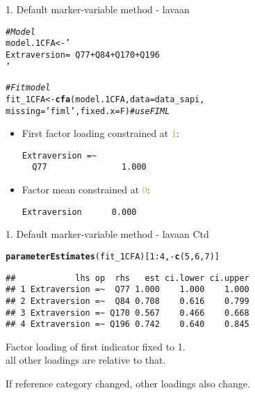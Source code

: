 \documentclass[10pt]{beamer}\usepackage[]{graphicx}\usepackage[]{xcolor}
\makeatletter
\newcommand{\hlnum}[1]{\textcolor[rgb]{0.686,0.059,0.569}{#1}}%
\newcommand{\hlsng}[1]{\textcolor[rgb]{0.192,0.494,0.8}{#1}}%
\newcommand{\hlcom}[1]{\textcolor[rgb]{0.678,0.584,0.686}{\textit{#1}}}%
\newcommand{\hlopt}[1]{\textcolor[rgb]{0,0,0}{#1}}%
\newcommand{\hldef}[1]{\textcolor[rgb]{0.345,0.345,0.345}{#1}}%
\newcommand{\hlkwb}[1]{\textcolor[rgb]{0.69,0.353,0.396}{#1}}%
\newcommand{\hlkwc}[1]{\textcolor[rgb]{0.333,0.667,0.333}{#1}}%
\newcommand{\hlkwd}[1]{\textcolor[rgb]{0.737,0.353,0.396}{\textbf{#1}}}%
\newenvironment{kframe}{%
 \def\at@end@of@kframe{}%
 \ifinner\ifhmode%
  \def\at@end@of@kframe{\end{minipage}}%
  \begin{minipage}{\columnwidth}%
 \fi\fi%
 \def\FrameCommand##1{\hskip\@totalleftmargin \hskip-\fboxsep
 \colorbox{shadecolor}{##1}\hskip-\fboxsep
     \hskip-\linewidth \hskip-\@totalleftmargin \hskip\columnwidth}%
 \MakeFramed {\advance\hsize-\width
   \@totalleftmargin\z@ \linewidth\hsize
   \@setminipage}}%
 {\par\unskip\endMakeFramed%
 \at@end@of@kframe}
\newenvironment{knitrout}{}{} %
\makeatother
\begin{document}
\begin{frame}[fragile]{1. Default marker-variable method - lavaan}

\begin{knitrout}
\color{fgcolor}\begin{kframe}
\begin{alltt}
\hlcom{# Model}
\hldef{model.1CFA} \hlkwb{<-} \hlsng{'
 Extraversion =~ Q77 + Q84 + Q170 + Q196
'}

\hlcom{# Fit model}
\hldef{fit_1CFA} \hlkwb{<-} \hlkwd{cfa}\hldef{(model.1CFA,} \hlkwc{data}\hldef{=data_sapi,}
                \hlkwc{missing}\hldef{=}\hlsng{'fiml'}\hldef{,} \hlkwc{fixed.x}\hldef{=F)}  \hlcom{# use FIML}
\end{alltt}
\end{kframe}
\end{knitrout}

\begin{itemize}
    \item First factor loading constrained at \textcolor{orange}{1}:\\
\begin{verbatim}
Extraversion =~                                     
  Q77               1.000
\end{verbatim}
    \item Factor mean constrained at \textcolor{orange}{0}:\\
\begin{verbatim}
Extraversion      0.000
\end{verbatim}
\end{itemize} 

\end{frame}
%
\begin{frame}[fragile]{1. Default marker-variable method - lavaan Ctd}

\begin{knitrout}
\color{fgcolor}\begin{kframe}
\begin{alltt}
\hlkwd{parameterEstimates}\hldef{(fit_1CFA)[}\hlnum{1}\hlopt{:}\hlnum{4}\hldef{,}\hlopt{-}\hlkwd{c}\hldef{(}\hlnum{5}\hldef{,}\hlnum{6}\hldef{,}\hlnum{7}\hldef{)]}
\end{alltt}
\begin{verbatim}
##            lhs op  rhs   est ci.lower ci.upper
## 1 Extraversion =~  Q77 1.000    1.000    1.000
## 2 Extraversion =~  Q84 0.708    0.616    0.799
## 3 Extraversion =~ Q170 0.567    0.466    0.668
## 4 Extraversion =~ Q196 0.742    0.640    0.845
\end{verbatim}
\end{kframe}
\end{knitrout}

Factor loading of first indicator fixed to 1. \\
all other loadings are relative to that.

\vspace{5mm}

If reference category changed, other loadings also change. 

\end{frame}
\end{document}
